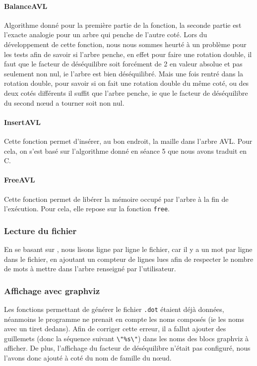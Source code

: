 \documentclass{article} %
\begin{document}
\paragraph{BalanceAVL} Algorithme donné pour la première partie de la fonction, la seconde partie est l'exacte analogie pour un arbre qui penche de l'autre coté. Lors du développement de cette fonction, nous nous sommes heurté à un problème pour les tests afin de savoir si l'arbre penche, en effet pour faire une rotation double, il faut que le facteur de déséquilibre soit forcément de 2 en valeur absolue et pas seulement non nul, ie l'arbre est bien déséquilibré. Mais une fois rentré dans la rotation double, pour savoir si on fait une rotation double du même coté, ou des deux cotés différents il suffit que l'arbre penche, ie que le facteur de déséquilibre du second nœud a tourner soit non nul. 

\paragraph{InsertAVL} Cette fonction permet d'insérer, au bon endroit, la maille dans l'arbre AVL. Pour cela, on s'est basé sur l'algorithme donné en séance 5 que nous avons traduit en C.

\paragraph{FreeAVL} Cette fonction permet de libérer la mémoire occupé par l'arbre à la fin de l'exécution. Pour cela, elle repose sur la fonction \texttt{free}. 

\subsubsection{Lecture du fichier}
En se basant sur \cite{lect_lines}, nous lisons ligne par ligne le fichier, car il y a un mot par ligne dans le fichier, en ajoutant un compteur de lignes lues afin de respecter le nombre de mots à mettre dans l'arbre renseigné par l'utilisateur.  

\subsubsection{Affichage avec graphviz}
Les fonctions permettant de générer le fichier \texttt{.dot} étaient déjà données, néanmoins le programme ne prenait en compte les noms composés (ie les noms avec un tiret dedans). Afin de corriger cette erreur, il a fallut ajouter des guillemets (donc la séquence suivant \texttt{\textbackslash "\%s\textbackslash "}) dans les noms des blocs graphviz à afficher. De plus, l'affichage du facteur de déséquilibre n'était pas configuré, nous l'avons donc ajouté à coté du nom de famille du nœud.
\end{document}
